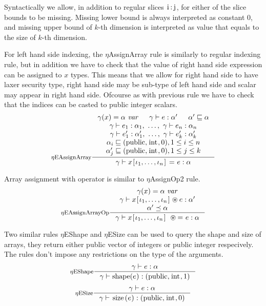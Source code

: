 \documentclass[a4paper, 10pt, draft]{report}
\newcommand{\mycode}[1]{\ensuremath{\mbox{\lstinline{#1}}}}
\begin{document}
Syntactically we allow, in addition to regular slices \mycode{i:j}, for either
of the slice bounds to be missing. Missing lower bound is always interpreted as
constant $0$, and missing upper bound of $k$-th dimension is interpreted as
value that equals to the size of $k$-th dimension.

For left hand side indexing, the $\eta$AssignArray rule is similarly to regular
indexing rule, but in addition we have to check that the value of right hand
side expression can be assigned to $x$ types. This means that we allow for
right hand side to have laxer security type, right hand side may be sub-type of
left hand side and scalar may appear in right hand side. Ofcourse as with
previous rule we have to check that the indices can be casted to public integer
scalars.
\[ \inference[$\eta$EAssignArray]
{
  \gamma(x) = \alpha\ \mathit{var}  &
  \gamma |- e : \alpha' & \alpha' \sqsubseteq \alpha \\
  \gamma |- e_1 : \alpha_1,\ \ldots,\ \gamma |- e_n : \alpha_n \\
  \gamma |- e'_1 : \alpha'_1,\ \ldots,\ \gamma |- e'_k : \alpha'_k \\
  \alpha_i \sqsubseteq (\mycode{public}, \mycode{int}, 0), 1 \le i \le n \\
  \alpha'_j \sqsubseteq (\mycode{public}, \mycode{int}, 0), 1 \le j \le k
}
{
  \gamma |- x \mycode{[} \iota_1, \ldots, \iota_n \mycode{]}\ \mycode{=}\ e : \alpha
} \]

Array assignment with operator is similar to $\eta$AssignOp2 rule.
\[ \inference[$\eta$EAssignArrayOp]
{
\gamma(x) = \alpha\ \mathit{var} \\
  \gamma |-  x \mycode{[} \iota_1, \ldots, \iota_n \mycode{]} \circledast e : \alpha' \\
  \alpha' \preceq \alpha
}
{
  \gamma |- x \mycode{[} \iota_1, \ldots, \iota_n \mycode{]}\ \circledast \mycode{=}\ e : \alpha
} \]

Two similar rules $\eta$EShape and $\eta$ESize  can be used to query the shape
and size of arrays, they return either public vector of integers or public
integer respecively. The rules don't impose any restrictions on the
type of the arguments.
\[ \inference[$\eta$EShape]
{
  \gamma |- e : \alpha
}
{
  \gamma |- \mycode{shape(} e \mycode{)} : \left(\mycode{public}, \mycode{int}, 1\right)
} \]
\[ \inference[$\eta$ESize]
{
  \gamma |- e : \alpha
}
{
  \gamma |- \mycode{size(} e \mycode{)} : \left(\mycode{public}, \mycode{int}, 0\right)
} \]
\end{document}
